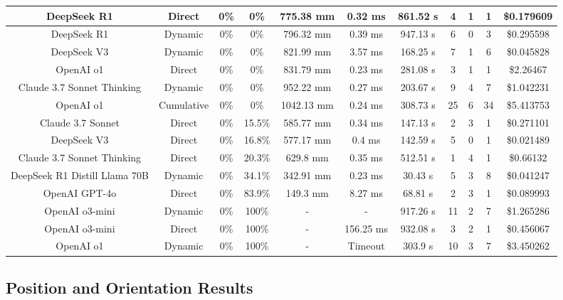 \begin{landscape}
\begin{table}[H]
\begin{center}
\begin{tabular}{|c|c|c|c|c|c|c|c|c|c|c|}
    \hline
    DeepSeek R1 & Direct & 0\% & 0\% & 775.38 mm & 0.32 ms & 861.52 s & 4 & 1 & 1 & \$0.179609 \\
    \hline
    DeepSeek R1 & Dynamic & 0\% & 0\% & 796.32 mm & 0.39 ms & 947.13 s & 6 & 0 & 3 & \$0.295598 \\
    \hline
    DeepSeek V3 & Dynamic & 0\% & 0\% & 821.99 mm & 3.57 ms & 168.25 s & 7 & 1 & 6 & \$0.045828 \\
    \hline
    OpenAI o1 & Direct & 0\% & 0\% & 831.79 mm & 0.23 ms & 281.08 s & 3 & 1 & 1 & \$2.26467 \\
    \hline
    Claude 3.7 Sonnet Thinking & Dynamic & 0\% & 0\% & 952.22 mm & 0.27 ms & 203.67 s & 9 & 4 & 7 & \$1.042231 \\
    \hline
    OpenAI o1 & Cumulative & 0\% & 0\% & 1042.13 mm & 0.24 ms & 308.73 s & 25 & 6 & 34 & \$5.413753 \\
    \hline
    Claude 3.7 Sonnet & Direct & 0\% & 15.5\% & 585.77 mm & 0.34 ms & 147.13 s & 2 & 3 & 1 & \$0.271101 \\
    \hline
    DeepSeek V3 & Direct & 0\% & 16.8\% & 577.17 mm & 0.4 ms & 142.59 s & 5 & 0 & 1 & \$0.021489 \\
    \hline
    Claude 3.7 Sonnet Thinking & Direct & 0\% & 20.3\% & 629.8 mm & 0.35 ms & 512.51 s & 1 & 4 & 1 & \$0.66132 \\
    \hline
    DeepSeek R1 Distill Llama 70B & Dynamic & 0\% & 34.1\% & 342.91 mm & 0.23 ms & 30.43 s & 5 & 3 & 8 & \$0.041247 \\
    \hline
    OpenAI GPT-4o & Direct & 0\% & 83.9\% & 149.3 mm & 8.27 ms & 68.81 s & 2 & 3 & 1 & \$0.089993 \\
    \hline
    OpenAI o3-mini & Dynamic & 0\% & 100\% & - & - & 917.26 s & 11 & 2 & 7 & \$1.265286 \\
    \hline
    OpenAI o3-mini & Direct & 0\% & 100\% & - & 156.25 ms & 932.08 s & 3 & 2 & 1 & \$0.456067 \\
    \hline
    OpenAI o1 & Dynamic & 0\% & 100\% & - & Timeout & 303.9 s & 10 & 3 & 7 & \$3.450262 \\
    \hline
\end{tabular}
\label{Results-Position-1-6}
\end{center}
\end{table}

\subsection{Position and Orientation Results}


\end{landscape}
